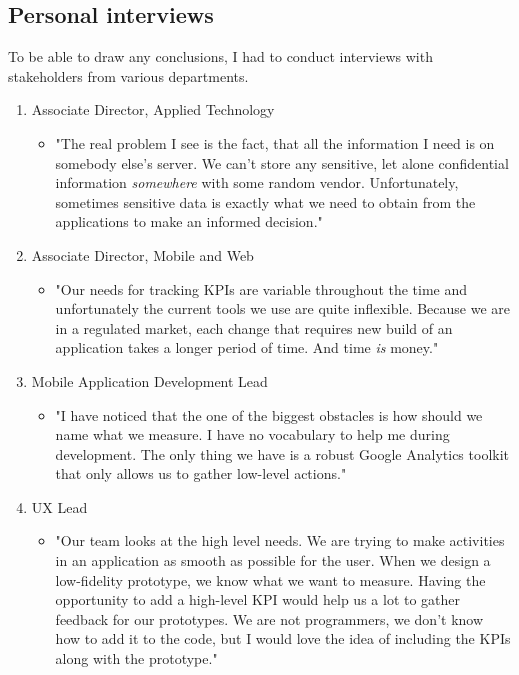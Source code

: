 \subsection{Personal interviews}

To be able to draw any conclusions, I had to conduct interviews with stakeholders from various departments.

\begin{enumerate}
		\item Associate Director, Applied Technology
		\begin{itemize}
				\item[] "The real problem I see is the fact, that all the information I need is on somebody else's server. We can't store any sensitive, let alone confidential information \emph{somewhere} with some random vendor. Unfortunately, sometimes sensitive data is exactly what we need to obtain from the applications to make an informed decision."
		\end{itemize}	

		\item Associate Director, Mobile and Web
		\begin{itemize}
				\item[] "Our needs for tracking KPIs are variable throughout the time and unfortunately the current tools we use are quite inflexible. Because we are in a regulated market, each change that requires new build of an application takes a longer period of time. And time \emph{is} money."
		\end{itemize}				
		
		\item Mobile Application Development Lead
		\begin{itemize}
				\item[] "I have noticed that the one of the biggest obstacles is how should we name what we measure. I have no vocabulary to help me during development. The only thing we have is a robust Google Analytics toolkit that only allows us to gather low-level actions."
		\end{itemize}
		
		\item UX Lead
		\begin{itemize}
				\item[] "Our team looks at the high level needs. We are trying to make activities in an application as smooth as possible for the user. When we design a low-fidelity prototype, we know what we want to measure. Having the opportunity to add a high-level KPI would help us a lot to gather feedback for our prototypes. We are not programmers, we don't know how to add it to the code, but I would love the idea of including the KPIs along with the prototype."
		\end{itemize}
\end{enumerate}


